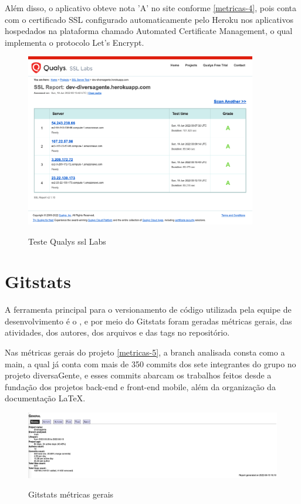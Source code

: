 Além disso, o aplicativo obteve nota 'A' no site  conforme \autoref{metricas-4}, pois conta com o certificado SSL configurado automaticamente pelo Heroku nos aplicativos hospedados na plataforma chamado Automated Certificate Management, o qual implementa o protocolo Let’s Encrypt.

\begin{figure}[h]
	\centering
	\caption{\label{fig_arq_virado}Teste Qualys \ac{ssl} Labs}
	\includegraphics[width=0.90\textwidth]{anexos/metricas4.png}
	\label{metricas-4}
\end{figure}


\pagebreak

\section{Gitstats}

A ferramenta principal para o versionamento de código utilizada pela equipe de desenvolvimento é o , e por meio do Gitstats foram geradas métricas gerais, das atividades, dos autores, dos arquivos e das tags no repositório. 

Nas métricas gerais do projeto \autoref{metricas-5}, a branch analisada consta como a main, a qual já conta com mais de 350 commits dos sete integrantes do grupo no projeto diversaGente, e esses commits abarcam os trabalhos feitos desde a fundação dos projetos back-end e front-end mobile, além da organização da documentação LaTeX. 

\begin{figure}[htb]
	\centering
	\caption{\label{fig_arq_virado}Gitstats métricas gerais}
	\includegraphics[width=1.00\textwidth]{anexos/metricas5.png}
	\label{metricas-5}
\end{figure}


